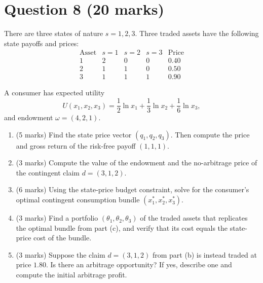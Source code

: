\documentclass[12pt]{article}
\begin{document}
\bigskip

\newpage
\section*{Question 8 (20 marks)}

There are three states of nature $s=1,2,3$. Three traded assets have the following state payoffs and prices:
\[
\begin{array}{c|ccc|c}
\text{Asset} & s=1 & s=2 & s=3 & \text{Price} \\
\hline
1 & 2 & 0 & 0 & 0.40 \\
2 & 1 & 1 & 0 & 0.50 \\
3 & 1 & 1 & 1 & 0.90
\end{array}
\]

A consumer has expected utility
\[
U(x_1,x_2,x_3)=\frac12\ln x_1+\frac13\ln x_2+\frac16\ln x_3,
\]
and endowment $\omega=(4,2,1)$.

\begin{enumerate}[label=(\alph*)]
\item (5 marks) Find the state price vector $(q_1,q_2,q_3)$. Then compute the price and gross return of the risk-free payoff $(1,1,1)$.
\item (3 marks) Compute the value of the endowment and the no-arbitrage price of the contingent claim $d=(3,1,2)$.
\item (6 marks) Using the state-price budget constraint, solve for the consumer's optimal contingent consumption bundle $(x_1^*,x_2^*,x_3^*)$.
\item (3 marks) Find a portfolio $(\theta_1,\theta_2,\theta_3)$ of the traded assets that replicates the optimal bundle from part (c), and verify that its cost equals the state-price cost of the bundle.
\item (3 marks) Suppose the claim $d=(3,1,2)$ from part (b) is instead traded at price $1.80$. Is there an arbitrage opportunity? If yes, describe one and compute the initial arbitrage profit.
\end{enumerate}
\end{document}
